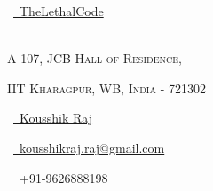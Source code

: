 \begin{multicols}{3}
\normalsize \faGithub\ {\href{https://github.com/TheLethalCode}{\  TheLethalCode}}\\
\normalsize {}\\
\columnbreak
\normalsize\par{\par} %
\par{\centering\normalsize {\textsc{A-107, JCB Hall of Residence, }}\hfill\par}
\vspace{-0.2cm}
\par{\centering\normalsize {\textsc{IIT Kharagpur, WB, India - 721302 }}\hfill\par}

\columnbreak
\raggedright\hfill\normalsize  \faLinkedinSquare\ {\href{https://www.linkedin.com/in/kousshik-raj-murali-b3976916a/}{\  Kousshik Raj}}\\
\raggedright\hfill\normalsize \faEnvelope\ {\href{mailto:kousshikraj.raj@gmail.com}{\  kousshikraj.raj@gmail.com}}\\
\raggedright\hfill{\faPhone\ \  +91-9626888198}
\end{multicols}


\vspace{-0.1cm}
